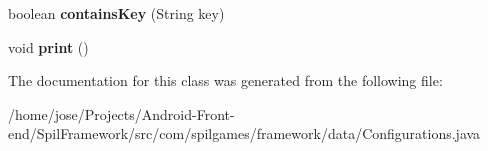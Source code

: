 \begin{DoxyCompactItemize}
\item 
\hypertarget{classcom_1_1spilgames_1_1framework_1_1data_1_1_configurations_abc879f4ac0c31f79c7de215f0d4a8836}{boolean {\bfseries contains\-Key} (String key)}\label{classcom_1_1spilgames_1_1framework_1_1data_1_1_configurations_abc879f4ac0c31f79c7de215f0d4a8836}

\item 
\hypertarget{classcom_1_1spilgames_1_1framework_1_1data_1_1_configurations_a0b28c8418eb7dd18b3769d933cf04c11}{void {\bfseries print} ()}\label{classcom_1_1spilgames_1_1framework_1_1data_1_1_configurations_a0b28c8418eb7dd18b3769d933cf04c11}

\end{DoxyCompactItemize}


The documentation for this class was generated from the following file\-:\begin{DoxyCompactItemize}
\item 
/home/jose/\-Projects/\-Android-\/\-Front-\/end/\-Spil\-Framework/src/com/spilgames/framework/data/Configurations.\-java\end{DoxyCompactItemize}
